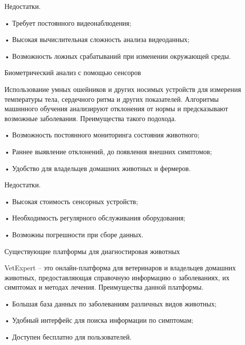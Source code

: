 {  \par \redline Недостатки.
  
  \par \redline • Требует постоянного видеонаблюдения;
  \par \redline • Высокая вычислительная сложность анализа видеоданных;
  \par \redline • Возможность ложных срабатываний при изменении окружающей среды.


  \par \redline Биометрический анализ с помощью сенсоров

  \par \redline Использование умных ошейников и других носимых устройств для измерения температуры тела, сердечного ритма и других показателей. Алгоритмы машинного обучения анализируют отклонения от нормы и предсказывают возможные заболевания. Преимущества такого подохода.
  
  \par \redline • Возможность постоянного мониторинга состояния животного;
  \par \redline • Раннее выявление отклонений, до появления внешних симптомов;
  \par \redline • Удобство для владельцев домашних животных и фермеров.

  \par \redline Недостатки.
  
  \par \redline • Высокая стоимость сенсорных устройств;
  \par \redline • Необходимость регулярного обслуживания оборудования;
  \par \redline • Возможны погрешности при сборе данных.
  
  
  \par \redline Существующие платформы для диагностировая животных

  \par \redline VetExpert – это онлайн-платформа для ветеринаров и владельцев домашних животных, предоставляющая справочную информацию о заболеваниях, их симптомах и методах лечения. Преимущества данной платформы.
  
  \par \redline • Большая база данных по заболеваниям различных видов животных;
  \par \redline • Удобный интерфейс для поиска информации по симптомам;
  \par \redline • Доступен бесплатно для пользователей.

}
